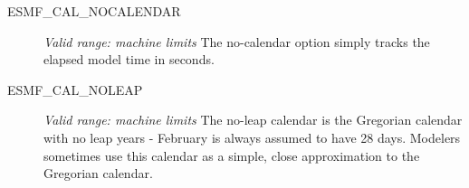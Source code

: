 \begin{description}
\item [ESMF\_CAL\_NOCALENDAR] 
{\it Valid range: machine limits}
\newline The no-calendar option simply tracks the elapsed model time in seconds.

\item [ESMF\_CAL\_NOLEAP]
{\it Valid range: machine limits} 
\newline The no-leap calendar is the Gregorian calendar with no leap years - 
February is always assumed to have 28 days.  Modelers sometimes use this 
calendar as a simple, close approximation to the Gregorian calendar.

\end{description}
